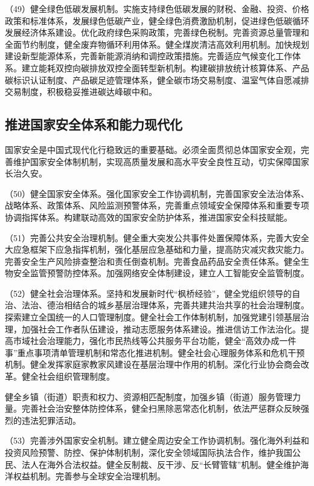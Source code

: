     （49）健全绿色低碳发展机制。实施支持绿色低碳发展的财税、金融、投资、价格政策和标准体系，发展绿色低碳产业，健全绿色消费激励机制，促进绿色低碳循环发展经济体系建设。优化政府绿色采购政策，完善绿色税制。完善资源总量管理和全面节约制度，健全废弃物循环利用体系。健全煤炭清洁高效利用机制。加快规划建设新型能源体系，完善新能源消纳和调控政策措施。完善适应气候变化工作体系。建立能耗双控向碳排放双控全面转型新机制。构建碳排放统计核算体系、产品碳标识认证制度、产品碳足迹管理体系，健全碳市场交易制度、温室气体自愿减排交易制度，积极稳妥推进碳达峰碳中和。

    \subsection{推进国家安全体系和能力现代化}

    国家安全是中国式现代化行稳致远的重要基础。必须全面贯彻总体国家安全观，完善维护国家安全体制机制，实现高质量发展和高水平安全良性互动，切实保障国家长治久安。

    （50）健全国家安全体系。强化国家安全工作协调机制，完善国家安全法治体系、战略体系、政策体系、风险监测预警体系，完善重点领域安全保障体系和重要专项协调指挥体系。构建联动高效的国家安全防护体系，推进国家安全科技赋能。

    （51）完善公共安全治理机制。健全重大突发公共事件处置保障体系，完善大安全大应急框架下应急指挥机制，强化基层应急基础和力量，提高防灾减灾救灾能力。完善安全生产风险排查整治和责任倒查机制。完善食品药品安全责任体系。健全生物安全监管预警防控体系。加强网络安全体制建设，建立人工智能安全监管制度。

    （52）健全社会治理体系。坚持和发展新时代“枫桥经验”，健全党组织领导的自治、法治、德治相结合的城乡基层治理体系，完善共建共治共享的社会治理制度。探索建立全国统一的人口管理制度。健全社会工作体制机制，加强党建引领基层治理，加强社会工作者队伍建设，推动志愿服务体系建设。推进信访工作法治化。提高市域社会治理能力，强化市民热线等公共服务平台功能，健全“高效办成一件事”重点事项清单管理机制和常态化推进机制。健全社会心理服务体系和危机干预机制。健全发挥家庭家教家风建设在基层治理中作用的机制。深化行业协会商会改革。健全社会组织管理制度。

    健全乡镇（街道）职责和权力、资源相匹配制度，加强乡镇（街道）服务管理力量。完善社会治安整体防控体系，健全扫黑除恶常态化机制，依法严惩群众反映强烈的违法犯罪活动。

    （53）完善涉外国家安全机制。建立健全周边安全工作协调机制。强化海外利益和投资风险预警、防控、保护体制机制，深化安全领域国际执法合作，维护我国公民、法人在海外合法权益。健全反制裁、反干涉、反“长臂管辖”机制。健全维护海洋权益机制。完善参与全球安全治理机制。

